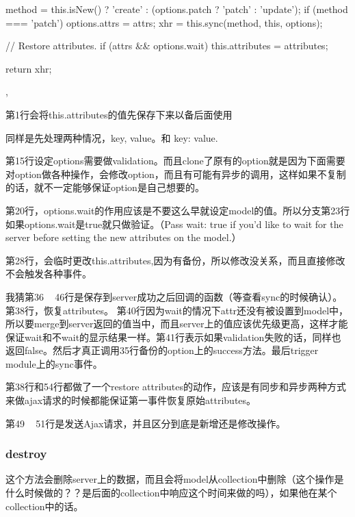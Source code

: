 \begin{JavaScript}
{      method = this.isNew() ? 'create' : (options.patch ? 'patch' : 'update');
      if (method === 'patch') options.attrs = attrs;
      xhr = this.sync(method, this, options);

      // Restore attributes.
      if (attrs && options.wait) this.attributes = attributes;

      return xhr;
    },
\end{JavaScript}

第1行会将this.attributes的值先保存下来以备后面使用

同样是先处理两种情况，key, value。和 {key: value}. 

第15行设定options需要做validation。而且clone了原有的option就是因为下面需要对option做各种操作，会修改option，而且有可能有异步的调用，这样如果不复制的话，就不一定能够保证option是自己想要的。

第20行，options.wait的作用应该是不要这么早就设定model的值。所以分支第23行如果options.wait是true就只做验证。（Pass {wait: true} if you'd like to wait for the server before setting the new attributes on the model.）

第28行，会临时更改this.attributes,因为有备份，所以修改没关系，而且直接修改不会触发各种事件。

我猜第36 ~ 46行是保存到server成功之后回调的函数（等查看sync的时候确认）。 第38行，恢复attributes。 第40行因为wait的情况下attr还没有被设置到model中，所以要merge到server返回的值当中，而且server上的值应该优先级更高，这样才能保证wait和不wait的显示结果一样。第41行表示如果validation失败的话，同样也返回false。然后才真正调用35行备份的option上的success方法。最后trigger module上的sync事件。


第38行和54行都做了一个restore attributes的动作，应该是有同步和异步两种方式来做ajax请求的时候都能保证第一事件恢复原始attributes。

第49 ~ 51行是发送Ajax请求，并且区分到底是新增还是修改操作。

\subsubsection{destroy}

这个方法会删除server上的数据，而且会将model从collection中删除（这个操作是什么时候做的？？是后面的collection中响应这个时间来做的吗），如果他在某个collection中的话。

